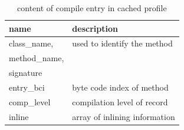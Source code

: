 \begin{table}[ht!]
  \caption{content of compile entry in cached profile}
  \label{t:compile}
  \begin{center}
    \begin{tabular}{|p{5cm}|p{10.5cm}|} 
      \hline
       \textbf{name} & \textbf{description} \\ \hline\hline
       class\_name,& used to identify the method\\
       method\_name, & \\
       signature &\\ \hline
       entry\_bci & byte code index of method\\ \hline
       comp\_level & compilation level of record\\ \hline
       inline & array of inlining information\\ \hline        
    \end{tabular}
  \end{center}
\end{table} 
